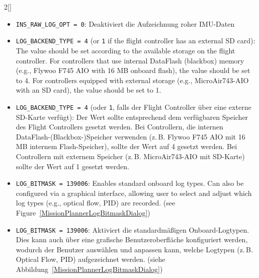 \begin{paracol}{2}[]
\colger

\begin{itemize}
\item \texttt{INS\_RAW\_LOG\_OPT = 0}: Deaktiviert die Aufzeichnung roher IMU-Daten
\end{itemize}

\coleng

\begin{itemize}
\item \texttt{LOG\_BACKEND\_TYPE = 4} (or \texttt{1} if the flight controller has an external SD card): The value should be set according to the available storage on the flight controller. For controllers that use internal DataFlash (blackbox) memory (e.g., Flywoo F745 AIO with 16 MB onboard flash), the value should be set to 4. For controllers equipped with external storage (e.g., MicroAir743-AIO with an SD card), the value should be set to 1.
\end{itemize}

\colger

\begin{itemize}
\item \texttt{LOG\_BACKEND\_TYPE = 4} (oder \texttt{1}, falls der Flight Controller über eine externe SD-Karte verfügt): Der Wert sollte entsprechend dem verfügbaren Speicher des Flight Controllers gesetzt werden. Bei Controllern, die internen DataFlash-(Blackbox-)Speicher verwenden (z.\,B. Flywoo F745 AIO mit 16 MB internem Flash-Speicher), sollte der Wert auf 4 gesetzt werden. Bei Controllern mit externem Speicher (z.\,B. MicroAir743-AIO mit SD-Karte) sollte der Wert auf 1 gesetzt werden.
\end{itemize}

\coleng

\begin{itemize}
\item \texttt{LOG\_BITMASK = 139006}: Enables standard onboard log types. Can also be configured via a graphical interface, allowing user to select and adjust which log types (e.g., optical flow, PID) are recorded. (see Figure~\ref{MissionPlannerLogBitmaskDialog})
\end{itemize}

\colger

\begin{itemize}
\item \texttt{LOG\_BITMASK = 139006}: Aktiviert die standardmäßigen Onboard-Logtypen. Dies kann auch über eine grafische Benutzeroberfläche konfiguriert werden, wodurch der Benutzer auswählen und anpassen kann, welche Logtypen (z.\,B. Optical Flow, PID) aufgezeichnet werden. (siehe Abbildung~\ref{MissionPlannerLogBitmaskDialog})
\end{itemize}


\end{paracol}
